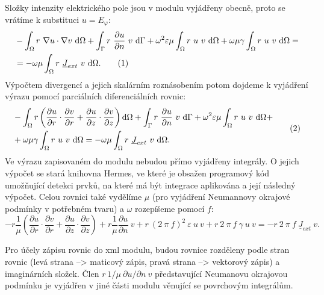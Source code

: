 \documentclass[12pt,a4paper,oneside]{article}
\numberwithin{equation}{section} %
\numberwithin{figure}{section} %
\numberwithin{table}{section} %
\newcommand{\faz}[1]{{\underline{#1}}} %
\newcommand\numberthis{\addtocounter{equation}{1}\tag{\theequation}}
\begin{document}
Složky intenzity elektrického pole jsou v modulu vyjádřeny obecně, proto se vrátíme k substituci $u = E_\varphi$:
\begin{align*}
&- \int _{\Omega} r ~ \nabla u \cdot \nabla v ~ \ud \Omega + \int _{\Gamma} r ~ \frac{\partial u}{\partial n} ~ v ~ \ud \Gamma + \omega ^2 \varepsilon \mu \int _{\Omega} r ~ u ~ v ~ \ud \Omega + \omega \mu \gamma \int _{\Omega} r ~ u ~ v ~ \ud \Omega =\\
&= - \omega \mu \int _{\Omega} r ~ \faz{J} _{ext} ~ v ~ \ud \Omega .
\numberthis
\end{align*}
Výpočtem divergencí a jejich skalárním roznásobením potom dojdeme k vyjádření výrazu pomocí parciálních diferenciálních rovnic:
\begin{equation*}
\begin{split}
&- \int _{\Omega} r \left( \frac{\partial u}{\partial r} \cdot \frac{\partial v}{\partial r} + \frac{\partial u}{\partial z} \cdot \frac{\partial v}{\partial z} \right) \ud \Omega + \int _{\Gamma} r ~ \frac{\partial u}{\partial n} ~ v ~ \ud \Gamma + \omega ^2 \varepsilon \mu \int _{\Omega} r ~ u ~ v ~ \ud \Omega +\\
& + \omega \mu \gamma \int _{\Omega} r ~ u ~ v ~ \ud \Omega = - \omega \mu \int _{\Omega} r ~ \faz{J} _{ext} ~ v ~ \ud \Omega .
\end{split}
\numberthis
\end{equation*}
Ve výrazu zapisovaném do modulu nebudou přímo vyjádřeny integrály. O jejich výpočet se stará knihovna Hermes, ve které je obsažen programový kód umožňující detekci prvků, na které má být integrace aplikována a její následný výpočet. Celou rovnici také vydělíme $\mu$ (pro vyjádření Neumannovy okrajové podmínky v potřebném tvaru) a $\omega$ rozepíšeme pomocí $f$:
\begin{equation}
\label{EphiWeakEpsilon}
- r \frac{1}{\mu} \left( \frac{\partial u}{\partial r} \cdot \frac{\partial v}{\partial r} + \frac{\partial u}{\partial z} \cdot \frac{\partial v}{\partial z} \right) + r \frac{1}{\mu} \frac{\partial u}{\partial n} ~ v + r ~ (2 ~ \pi ~ f) ^2 ~ \varepsilon ~ u ~ v + r ~ 2 ~ \pi ~ f ~ \gamma ~ u ~ v = - r ~ 2 ~ \pi ~ f ~ \faz{J} _{ext} ~ v .
\end{equation}

Pro účely zápisu rovnic do xml modulu, budou rovnice rozděleny podle stran rovnic (levá strana --> maticový zápis, pravá strana --> vektorový zápis) a imaginárních složek. Člen $r ~ 1/ \mu ~ \partial u / \partial n ~ v$ představující Neumanovu okrajovou podmínku je vyjádřen v jiné části modulu věnující se povrchovým integrálům.
\end{document}
